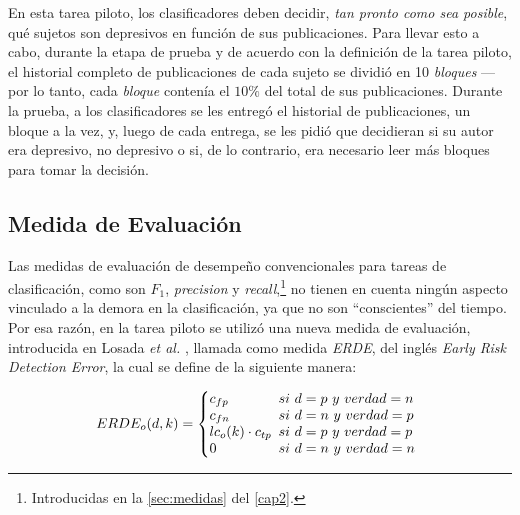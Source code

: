 En esta tarea piloto, los clasificadores deben decidir, \emph{tan pronto como sea posible}, qué sujetos son depresivos en función de sus publicaciones.
Para llevar esto a cabo, durante la etapa de prueba y de acuerdo con la definición de la tarea piloto, el historial completo de publicaciones de cada sujeto se dividió en 10 \emph{bloques} ---por lo tanto, cada \emph{bloque} contenía el $10\%$ del total de sus publicaciones. Durante la prueba, a los clasificadores se les entregó el historial de publicaciones, un bloque a la vez, y, luego de cada entrega, se les pidió que decidieran si su autor era depresivo, no depresivo o si, de lo contrario, era necesario leer más bloques para tomar la decisión.


\subsection{Medida de Evaluación}
\label{sec:eval_metric}

Las medidas de evaluación de desempeño convencionales para tareas de clasificación, como son $F_1$, \emph{precision} y \emph{recall},\footnote{Introducidas en la \autoref{sec:medidas} del \autoref{cap2}.} no tienen en cuenta ningún aspecto vinculado a la demora en la clasificación, ya que no son ``conscientes'' del tiempo.
Por esa razón, en la tarea piloto se utilizó una nueva medida de evaluación, introducida en Losada \emph{et al.} \cite{losada2016test}, llamada como medida \emph{ERDE}, del inglés \emph{Early Risk Detection Error}, la cual se define de la siguiente manera:



\begin{equation}
  ERDE_o(d,k) = \left\{
     \begin{array}{@{}l@{\thinspace}l}
        c_{fp} &\ si\ d=p\ y\ verdad=n\\
        c_{fn} &\ si\ d=n\ y\ verdad=p\\
        lc_o(k)\cdot c_{tp} &\ si\ d=p\ y\ verdad=p\\
        0 &\ si\ d=n\ y\ verdad=n\\
     \end{array}
   \right.
\label{eq:erde}
\end{equation}



